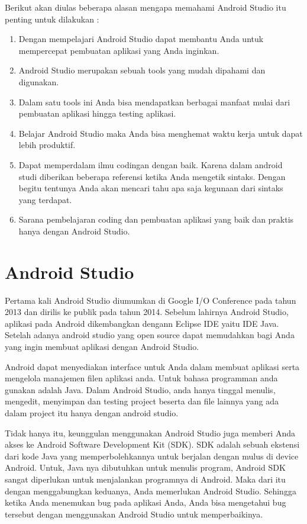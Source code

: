 Berikut akan diulas beberapa alasan mengapa memahami Android Studio itu penting untuk dilakukan :
\begin{enumerate}
    \item Dengan mempelajari Android Studio dapat membantu Anda untuk mempercepat pembuatan aplikasi yang Anda inginkan.
    \item Android Studio merupakan sebuah tools yang mudah dipahami dan digunakan.
    \item Dalam satu tools ini Anda bisa mendapatkan berbagai manfaat mulai dari pembuatan aplikasi hingga testing aplikasi.
    \item Belajar Android Studio maka Anda bisa menghemat waktu kerja untuk dapat lebih produktif.
    \item Dapat memperdalam ilmu codingan dengan baik. Karena dalam android studi diberikan beberapa referensi ketika Anda mengetik sintaks. Dengan begitu tentunya Anda akan mencari tahu apa saja kegunaan dari sintaks yang terdapat.
    \item Sarana pembelajaran coding dan pembuatan aplikasi yang baik dan praktis hanya dengan Android Studio.
\end{enumerate}

\section{Android Studio}
Pertama kali Android Studio diumumkan di Google I/O Conference pada tahun 2013 dan dirilis ke publik pada tahun 2014. Sebelum lahirnya Android Studio, aplikasi pada Android dikembangkan dengann Eclipse IDE yaitu IDE Java. Setelah adanya android studio yang open source dapat memudahkan bagi Anda yang ingin membuat aplikasi dengan Android Studio.

Android dapat menyediakan interface untuk Anda dalam membuat aplikasi serta mengelola manajemen filen aplikasi anda.  Untuk bahasa programman anda gunakan adalah Java. Dalam Android Studio, anda hanya tinggal menulis, mengedit, menyimpan  dan testing project beserta dan file lainnya yang ada dalam project itu hanya dengan android studio.

Tidak hanya itu, keunggulan menggunakan Android Studio juga memberi Anda akses ke Android Software Development Kit (SDK). SDK adalah sebuah ekstensi dari kode Java yang memperbolehkannya untuk berjalan dengan mulus di device Android. Untuk, Java nya dibutuhkan untuk menulis program, Android SDK sangat diperlukan untuk menjalankan programnya di Android. Maka dari itu dengan menggabungkan keduanya, Anda memerlukan Android Studio. Sehingga ketika Anda menemukan bug pada aplikasi Anda, Anda bisa mengetahui bug tersebut dengan menggunakan Android Studio untuk memperbaikinya.

